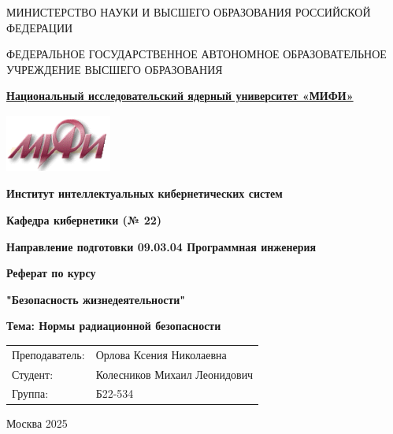 \documentclass[a4paper,12pt]{article}
\begin{document}
\begin{titlepage}
    \begin{center}
        \vspace*{0.5cm}

        МИНИСТЕРСТВО НАУКИ И ВЫСШЕГО ОБРАЗОВАНИЯ РОССИЙСКОЙ ФЕДЕРАЦИИ

        \vspace{0.5cm}

        ФЕДЕРАЛЬНОЕ ГОСУДАРСТВЕННОЕ АВТОНОМНОЕ ОБРАЗОВАТЕЛЬНОЕ УЧРЕЖДЕНИЕ ВЫСШЕГО ОБРАЗОВАНИЯ

        \vspace{1cm}

        \textbf{\underline{Национальный исследовательский ядерный университет «МИФИ»}}

        \vspace{0.5cm}

    \end{center}
    \hspace{2cm}\includegraphics[width=3.5cm,height=1.9cm]{image1.png}
    \begin{center}
        \vspace{1cm}

        \textbf{Институт интеллектуальных кибернетических систем}

        \vspace{0.5cm}

        \textbf{Кафедра кибернетики (№ 22)}

        \vspace{0.5cm}

        \textbf{Направление подготовки 09.03.04 Программная инженерия}

        \vspace{2cm}

        \textbf{Реферат по курсу}

        \vspace{0.5cm}

        \textbf{"Безопасность жизнедеятельности"}

        \vspace{2cm}

        \textbf{Тема: \guillemotleft Нормы радиационной безопасности\guillemotright}

        \vspace{1cm}

        \begin{tabular}{ll}
            Преподаватель: & Орлова Ксения Николаевна     \\
            Студент:       & Колесников Михаил Леонидович \\
            Группа:        & Б22-534                      \\
        \end{tabular}

        \vfill

        Москва 2025
    \end{center}
\end{titlepage}
\end{document}
